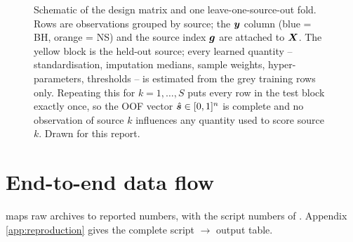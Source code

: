 \begin{figure}[htbp]
\caption[Design matrix and LOSO split]{Schematic of the design matrix and one leave-one-source-out fold. Rows are
observations grouped by source; the $\bm{y}$ column (blue = BH, orange = NS) and the source index $\bm{g}$ are attached to
$\bm{X}$. The yellow block is the held-out source; every learned quantity -- standardisation, imputation medians, sample
weights, hyper-parameters, thresholds -- is estimated from the grey training rows only. Repeating this for $k=1,\dots,S$
puts every row in the test block exactly once, so the OOF vector $\hat{\bm{s}}\in[0,1]^n$ is complete and no observation of source
$k$ influences any quantity used to score source $k$. Drawn for this report.}
\label{fig:designmatrix}
\end{figure}

\section{End-to-end data flow}\label{sec:dm-flow}

 maps raw archives to reported numbers, with the script numbers of . Appendix
\ref{app:reproduction} gives the complete script $\to$ output table.

